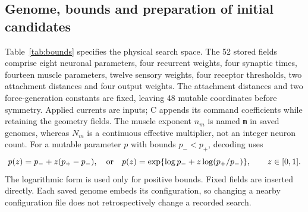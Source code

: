 \documentclass{styles/svproc}
\begin{document}
\subsection{Genome, bounds and preparation of initial candidates}
Table~\ref{tab:bounds} specifies the physical search space. The 52 stored fields comprise eight neuronal parameters, four recurrent weights, four synaptic times, fourteen muscle parameters, twelve sensory weights, four receptor thresholds, two attachment distances and four output weights. The attachment distances and two force-generation constants are fixed, leaving 48 mutable coordinates before symmetry. Applied currents are inputs; C appends its command coefficients while retaining the geometry fields. The muscle exponent $n_m$ is named \texttt{m} in saved genomes, whereas $N_m$ is a continuous effective multiplier, not an integer neuron count. For a mutable parameter $p$ with bounds $p_-<p_+$, decoding uses
\begin{equation}
 p(z)=p_-+z(p_+-p_-),\quad\hbox{or}\quad
 p(z)=\exp\{\log p_-+z\log(p_+/p_-)\},\qquad z\in[0,1].
 \label{eq:codec}
\end{equation}
The logarithmic form is used only for positive bounds. Fixed fields are inserted directly. Each saved genome embeds its configuration, so changing a nearby configuration file does not retrospectively change a recorded search.
\end{document}
